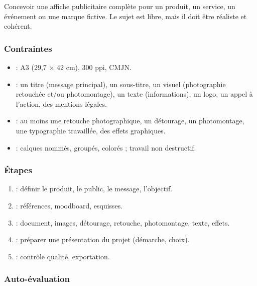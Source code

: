 Concevoir une affiche publicitaire complète pour un produit, un service, un événement ou une marque fictive. Le sujet est libre, mais il doit être réaliste et cohérent.

\subsubsection*{Contraintes}

\begin{itemize}
    \item {} : A3 (29,7 × 42 cm), 300 ppi, CMJN.
    \item {} : un titre (message principal), un sous-titre, un visuel (photographie retouchée et/ou photomontage), un texte (informations), un logo, un appel à l'action, des mentions légales.
    \item {} : au moins une retouche photographique, un détourage, un photomontage, une typographie travaillée, des effets graphiques.
    \item {} : calques nommés, groupés, colorés ; travail non destructif.
\end{itemize}

\subsubsection*{Étapes}

\begin{enumerate}
    \item {} : définir le produit, le public, le message, l'objectif.
    \item {} : références, moodboard, esquisses.
    \item {} : document, images, détourage, retouche, photomontage, texte, effets.
    \item {} : préparer une présentation du projet (démarche, choix).
    \item {} : contrôle qualité, exportation.
\end{enumerate}

\subsubsection*{Auto-évaluation}


